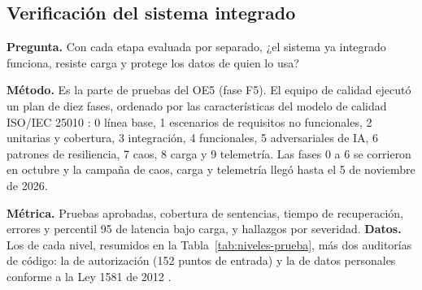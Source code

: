 \subsection{Verificación del sistema integrado}
\label{sec:calidad}
\label{sec:calidad-resumen}
\label{sec:control-calidad}
\label{sec:defectos}

\textbf{Pregunta.} Con cada etapa evaluada por separado, ¿el sistema ya integrado funciona, resiste
carga y protege los datos de quien lo usa?

\textbf{Método.} Es la parte de pruebas del OE5 (fase F5). El equipo de calidad ejecutó un plan de diez
fases, ordenado por las características del modelo de calidad ISO/IEC 25010 \citep{iso_25010_2011}: 0 línea
base, 1 escenarios de requisitos no funcionales, 2 unitarias y cobertura, 3 integración, 4 funcionales,
5 adversariales de IA, 6 patrones de resiliencia, 7 caos, 8 carga y 9 telemetría. Las fases 0 a 6 se corrieron
en octubre y la campaña de caos, carga y telemetría llegó hasta el 5 de noviembre de 2026.

\textbf{Métrica.} Pruebas aprobadas, cobertura de sentencias, tiempo de recuperación, errores y percentil 95 de
latencia bajo carga, y hallazgos por severidad. \textbf{Datos.} Los de cada nivel, resumidos en la
Tabla~\ref{tab:niveles-prueba}, más dos auditorías de código: la de autorización (152 puntos de entrada) y la
de datos personales conforme a la Ley 1581 de 2012 \citep{congreso_ley1581_2012}.

